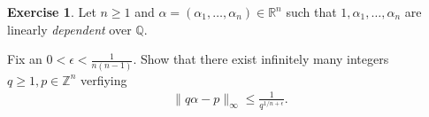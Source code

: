 \documentclass[12pt,a4paper]{article}
\theoremstyle{plain}
\newtheorem*{Sol*}{Solution}
\theoremstyle{definition}
\newtheorem{Ex}{Exercise}
\def \Q {\mathbb Q}
\def \R {\mathbb R}
\def \Z {\mathbb Z}
\newif\ifsolutions
\newcommand{\exercise}[2]{
			\begin{Ex} #1 \end{Ex}
			\ifsolutions  \begin{Sol*} #2 \end{Sol*} \bigskip \else \bigskip  \fi
		}
\begin{document}
\exercise{
	Let $n\geq1$ and $\alpha = (\alpha_1, \dots, \alpha_n) \in \R^n$ such that $1, \alpha_1, \dots, \alpha_n$ are linearly \emph{dependent} over $\Q$.

	Fix an $0 < \epsilon < \frac{1}{n(n-1)}$.
	Show that there exist infinitely many integers $q\geq1, p\in\Z^n$ verfiying
		\begin{gather*}
			 \| q \alpha - p \|_\infty \leq \frac{1}{q^{1/n + \epsilon}}.
		\end{gather*}
}
{
	Denote $\beta = (\alpha_2, \dots, \alpha_n) \in \R^{n-1}$.
	Without loss of generality, we may find an integer vector $v \in \Z^{n-1}$ such that
		\[ \alpha_1 = v^T \beta. \]

	We show that, by approximating $\beta$, we may approximate $\alpha_1$ as well.
	Dirichlet's theorem gives infinitely many $q \geq 1, \tilde{p} \in\Z^{n-1}$ such that
		\[ \| q \beta - p \|_\infty \leq \frac{1}{q^{1/(n-1)}}. \]
	We now note that $\epsilon$ was chosen such that
		\[ \frac{1}{q^{1/(n-1)}} < \frac{1}{q^{1/n + \epsilon}}, \]
	since $1/n + \epsilon < 1/(n-1)$.

	Let $p = v^T \tilde{p}$. Then
		\[ |q \alpha_1 - p| = |q v^T \beta - v^T \tilde{p}| \leq \frac{\| v \|_1}{q^{1/(n-1)}}. \]
	Finally, notice  that
		\[ \frac{\| v \|_1}{q^{1/(n-1)}} < \frac{1}{q^{1/n + \epsilon}} \]
	as soon as 
		\[ q \geq \| v \|_1^{\left( \frac{1}{n(n-1)} - \epsilon \right)^{-1}}, \]
	which must be true for infinitely many $q$.

	In conclusion, defining $p = (p_1, \tilde{p})$, we have found infinitely many $q \geq 1, p\in\Z^n$ such that
		\[ \| q \alpha - p \|_\infty \leq \frac{1}{q^{1/n + \epsilon}}. \]


}
\end{document}
